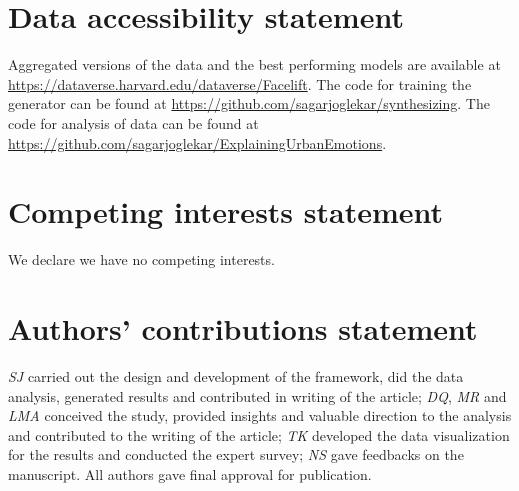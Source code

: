 \documentclass[]{rsos}%
\begin{document}
\maketitle





%

\section*{Data accessibility statement}
Aggregated versions of the data and the best performing models are available at \url{https://dataverse.harvard.edu/dataverse/Facelift}. The code for training the generator can be found at \url{https://github.com/sagarjoglekar/synthesizing}. The code for analysis of data can be found at \url{https://github.com/sagarjoglekar/ExplainingUrbanEmotions}.

\section*{Competing interests statement}

We declare we have no competing interests.

\section*{Authors' contributions statement}

\textsl{SJ} carried out the design and development of the framework, did the data analysis, generated results and contributed in writing of the article; \textsl{DQ}, \textsl{MR} and \textsl{LMA} conceived the study, provided insights and valuable direction to the analysis and contributed to the writing of the article; \textsl{TK} developed the data visualization for the results and conducted the expert survey; \textsl{NS} gave feedbacks  on the manuscript. All authors gave final approval for publication.

\end{document}
